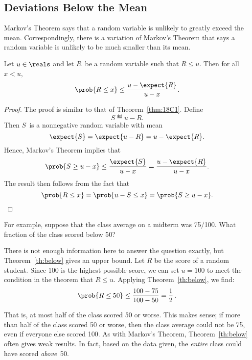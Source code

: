 \subsection{Deviations Below the Mean}

Markov's Theorem says that a random variable is unlikely to greatly
exceed the mean.  Correspondingly, there is a variation of Markov's
Theorem that says a random variable is unlikely to be much smaller
than its mean.

\begin{theorem}
\label{th:below}
Let $u \in \reals$ and let $R$~be a random variable such that $R \leq
u$.  Then for all~$x < u$, 
\[
    \prob{R \leq x} \leq \frac{u - \expect{R}}{u - x}.
\]
\end{theorem}

\begin{proof}
The proof is similar to that of Theorem~\ref{thm:18C1}.  Define
\begin{equation*}
    S \eqdef u - R.
\end{equation*}
Then $S$~is a nonnegative random variable with mean
\begin{equation*}
    \expect{S} = \expect{u - R} = u - \expect{R}.
\end{equation*}
Hence, Markov's Theorem implies that
\begin{equation*}
\prob{S \ge u - x}
     \le \frac{\expect{S}}{u - x}
    = \frac{u - \expect{R}}{u - x}.
\end{equation*}
The result then follows from the fact that
\begin{equation*}
\prob{R \le x}
    = \prob{u - S \le x}
    = \prob{S \ge u - x}. \qedhere
\end{equation*}
\end{proof}

For example, suppose that the class average on a midterm was
75/100.  What fraction of the class scored below 50?

There is not enough information here to answer the question exactly,
but Theorem~\ref{th:below} gives an upper bound.  Let $R$ be the score
of a random student.  Since 100 is the highest possible score, we can
set $u = 100$ to meet the condition in the theorem that $R \leq u$.
Applying Theorem~\ref{th:below}, we find:
\begin{equation*}
  \prob{R \leq 50} \leq \frac{100 - 75}{100 - 50} = \frac{1}{2}\,.
\end{equation*}

That is, at most half of the class scored 50 or worse.  This makes
sense; if more than half of the class scored 50 or worse, then the
class average could not be 75, even if everyone else scored 100.  As
with Markov's Theorem, Theorem~\ref{th:below} often gives weak
results.  In fact, based on the data given, the \emph{entire} class
could have scored \emph{above}~50.


